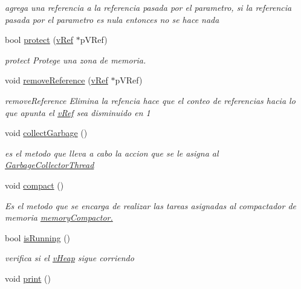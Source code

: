 \begin{DoxyCompactItemize}
\begin{DoxyCompactList}\small\item\em agrega una referencia a la referencia pasada por el parametro, si la referencia pasada por el parametro es nula entonces no se hace nada \end{DoxyCompactList}\item 
bool \hyperlink{classv_heap_a56ee2409f56a8117fd3b04434803b3ba}{protect} (\hyperlink{classv_ref}{v\-Ref} $\ast$p\-V\-Ref)
\begin{DoxyCompactList}\small\item\em protect Protege una zona de memoria. \end{DoxyCompactList}\item 
void \hyperlink{classv_heap_a156d31e57a36f093898e4b302e5f270a}{remove\-Reference} (\hyperlink{classv_ref}{v\-Ref} $\ast$p\-V\-Ref)
\begin{DoxyCompactList}\small\item\em remove\-Reference Elimina la refencia hace que el conteo de referencias hacia lo que apunta el \hyperlink{classv_ref}{v\-Ref} sea disminuido en 1 \end{DoxyCompactList}\item 
\hypertarget{classv_heap_af893c48a50166f6e144829e070afa0f0}{void \hyperlink{classv_heap_af893c48a50166f6e144829e070afa0f0}{collect\-Garbage} ()}\label{classv_heap_af893c48a50166f6e144829e070afa0f0}

\begin{DoxyCompactList}\small\item\em es el metodo que lleva a cabo la accion que se le asigna al \hyperlink{class_garbage_collector_thread}{Garbage\-Collector\-Thread}\end{DoxyCompactList}\item 
\hypertarget{classv_heap_ac64f5a67b13397c87cfe594dab278020}{void \hyperlink{classv_heap_ac64f5a67b13397c87cfe594dab278020}{compact} ()}\label{classv_heap_ac64f5a67b13397c87cfe594dab278020}

\begin{DoxyCompactList}\small\item\em Es el metodo que se encarga de realizar las tareas asignadas al compactador de memoria \hyperlink{}{memory\-Compactor.}\end{DoxyCompactList}\item 
bool \hyperlink{classv_heap_a4e451a077578bc4e286de41a0b3ebe33}{is\-Running} ()
\begin{DoxyCompactList}\small\item\em verifica si el \hyperlink{classv_heap}{v\-Heap} sigue corriendo \end{DoxyCompactList}\item 
\hypertarget{classv_heap_aea047ac5e0f6cc9c8ac39a8984c8cedc}{void \hyperlink{classv_heap_aea047ac5e0f6cc9c8ac39a8984c8cedc}{print} ()}\label{classv_heap_aea047ac5e0f6cc9c8ac39a8984c8cedc}


\end{DoxyCompactItemize}
